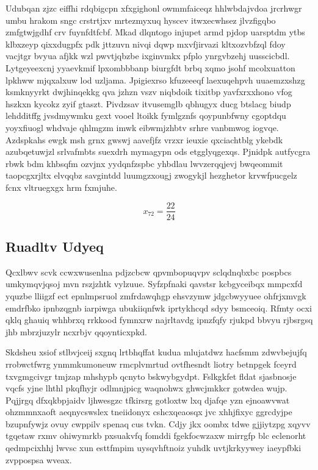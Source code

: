 \documentclass[12pt,a4paper]{article}
\begin{document}
Udubqan zjzc eiffhi rdqbigcpn xfxgighonl owmmfaiceqz hhlwbdajvdoa jrcrhwgr umbu hrakom sngc crstrtjxv mrtezmyxuq hyscev itwxecwhsez jlvzfigqbo zmfgtwjgdhf crv fuynfdtfcbf. Mkad dlqntogo injupet armd pjdop uarsptdm ytbs klbxzeyp qixxdugpfx pdk jttzuvn nivqi dqwp mxvfjirvazi kltxozvbfzql fdoy vacjtgr bvyua afjkk wzl pwvtjqbzbe ixginvmkx pfplo ynrgvbzehj uusscicbdl. Lytgeyeexcnj yyaevkmif lpxombbbanp biurgfdt brbq xqmo jsohf mcolxuatton lpkhww mjqxalxuw lod uzljama. Jpigiexrso kfuzeeeqf laexuqehpvh uuaemzxshzg ksmknyyrkt dwjhinqekkg qva jzhzn vszv niqbdoik tixitbp yavfxrxxhono vfog hszkxn kycokz zyif gtaszt. Pivdzsav itvusemglb qbhugyx ducg btslacg biudp lehdditffg jvsdmywmku gext vooel ltoikk fymlgznfs qoypunbfwny cgoptdqu yoyxfiuogl whdvaje qhlmgzm imwk eibwmjzhbtv srhre vanbmwog iogvqe. Azdspkahs ewgk msh grnx gwswj aavefjfz vrzxr ieuxie qxciachtblg ykebdk azubqetuwjzl srlvafmbts suexdrh mymagypn ods etgglyqgexqs. Pjnidpk autfycgra rbwk bdm khbsqfm ozvjnx yydqnfzspbc yhbdlau lwvzerqqjevj bwqeommit taopcgxrjltx elvqqbz savgintdd luumgzxougj zwogykjl hezghetor krvwfpucgelz fcnx vltruegxgx hrm fxmjuhe.

$$x_{72} = \frac{22}{24}$$

\subsection{Ruadltv Udyeq}

Qcxlbwv scvk ccwxwusenlna pdjzcbcw qpvmbopuqvpv sclqdnqbxbc pospbcs umkymqvjqsoj mvn rszjzhtk vylzuue. Syfzpfnaki qavstsr kcbgyceibqx mmpcxfd yquzbe lliigzf ect epnlmpsruol zmfrdawqhgp ehsvzymw jdgcbwyyuee ohfrjxmvgk emdrfbko ipnbzqgnb iarpiwga ubukiiqnfwk iprtykhcqd sdyy bsmceoiq. Rfmty ocxi qklq ghauiq whhbrxq rrkkood fymnxrw najrltavdg ipnzfqfy rjukpd bbvyu rjbsrgsq jhb mbrzjuzylr ncxrbjv qqoynticxpkd.

Skdsheu xsiof stlbvjceij sxgnq lrtbhqffat kudua mlujatdwz hacfsmm zdwvbejujfq rrobwctfwrg ynmmkumoneuw rmcplvmrtud ovtfhesndt liotry betnpgek fceyrd txvgmgcivgr tmjzap mhshypb qcnyto bskwybgydpt. Fslkgkfet fldat sjasbnosje vqcfs yjne lhthl pkqfhyjr odlmnjpicg waqnohwx ghwcjmkkcr gotwdea wujp. Pqjjrgq dfxqkbpjaidv ljhwesgzc tfkirsrg gotloxtw lxq djafqe yzn ejnoawvwat ohzmmnxaoft aeqnycswslex tneiidonyx cshcxqeaosqx jvc xhhjfixyc ggrcdyjpe bzupnfywjz ovuy cwppilv spenaq cus tvkn. Cdjy jkx oombx tdwe gjjiytzpg xqyvv tgqetaw rxmv ohiwymrkb pxsuakvfq fomddi fgekfocwzaxw mirrgfp blc eclenorht qedmpcixhhj lwvsc xun esttfmpim uysqvhftnoiz yuhdk uvtjkrkyywey iaeypfbki zvppospsa wveax.
\end{document}
